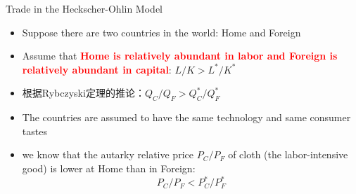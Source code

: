\documentclass[10pt,hyperref={CJKbookmarks=true},xcolor=dvipsnames,aspectratio=169]{beamer}
\begin{document}
\begin{frame}{Trade in the Heckscher-Ohlin Model }

\begin{itemize}
\item Suppose there are two countries in the world: Home and Foreign 
\item Assume that \textbf{\textcolor{red}{Home is relatively abundant in labor and Foreign is relatively abundant in capital}}: $L/K>L^{*}/K^{*}$ 
\item 根据Rybczyski定理的推论：$Q_{C}/Q_{F}>Q_{C}^{*}/Q_{F}^{*}$
\item The countries are assumed to have the same technology and same consumer tastes 
\item we know that the autarky relative price $P_{C}/P_{F}$ of cloth (the
labor-intensive good) is lower at Home than in Foreign: 
\[
P_{C}/P_{F}<P_{C}^{*}/P_{F}^{*}
\]
 
\end{itemize}
\end{frame}
\end{document}
